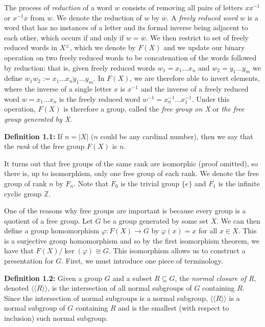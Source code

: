\documentclass[12pt]{article}
\newcommand{\vs}{\vskip10pt}
\begin{document}
	\vs 
	
	The process of \textit{reduction} of a word $w$ consists of removing all pairs of letters $xx^{-1}$ or $x^{-1}x$ from $w$. We denote the reduction of $w$ by $\overline{w}$. A \textit{freely reduced word} $w$ is a word that has no instances of a letter and its formal inverse being adjacent to each other, which occurs if and only if $w = \overline{w}$. We then restrict to set of freely reduced words in $X^{\pm}$, which we denote by $F(X)$ and we update our binary operation on two freely reduced words to be concatenation of the words followed by reduction: that is, given freely reduced words $w_1 = x_1...x_n$ and $w_2 = y_1...y_m$ we define $w_1 w_2 := \overline{x_1...x_n y_1...y_m}$. In $F(X)$, we are therefore able to invert elements, where the inverse of a single letter $x$ is $x^{-1}$ and the inverse of a freely reduced word $w = x_1 ... x_n$ is the freely reduced word $w^{-1} = x_n^{-1}...x_1^{-1}$. Under this operation, $F(X)$ is therefore a group, called the \textit{free group on X} or \textit{the free group generated by X}. 
	
	\vs 
	
	\textbf{Definition 1.1: } If $n = \vert X \vert$ ($n$ could be any cardinal number), then we say that the \textit{rank} of the free group $F(X)$ is $n$. 
	
	\vs
	
	It turns out that free groups of the same rank are isomorphic (proof omitted), so there is, up to isomorphism, only one free group of each rank. We denote the free group of rank $n$ by $F_n$. Note that $F_0$ is the trivial group $\{e\}$ and $F_1$ is the infinite cyclic group $\mathbb{Z}$.
	
	\vs 
	
	One of the reasons why free groups are important is because every group is a quotient of a free group. Let $G$ be a group generated by some set $X$. We can then define a group homomorphism $\varphi: F(X) \rightarrow G$ by $\varphi(x) = x$ for all $x \in X$. This is a surjective group homomorphism and so by the first isomorphism theorem, we have that $F(X) / \ker(\varphi) \cong G$. This isomorphism allows us to construct a presentation for $G$. First, we must introduce one piece of terminology.
	
	\vs 
	
	\textbf{Definition 1.2: } Given a group $G$ and a subset $R \subseteq G$, the \textit{normal closure of R}, denoted $\langle \langle R \rangle \rangle$, is the intersection of all normal subgroups of $G$ containing $R$. Since the intersection of normal subgroups is a normal subgroup, $\langle \langle R \rangle \rangle$ is a normal subgroup of $G$ containing $R$ and is the smallest (with respect to inclusion) such normal subgroup. 
	
\end{document}
